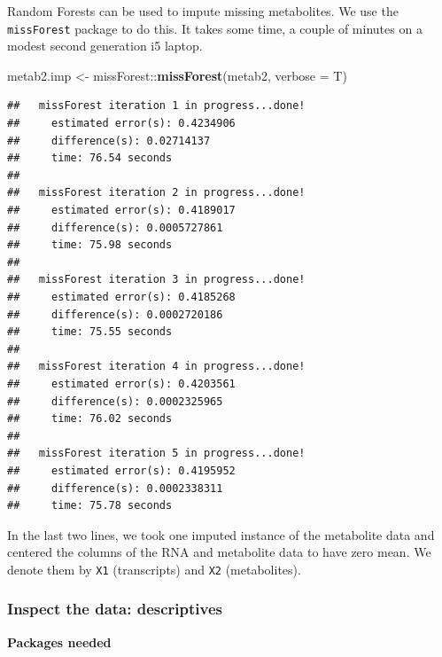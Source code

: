 \documentclass[]{article}
\newenvironment{Shaded}{\begin{snugshade}}{\end{snugshade}}
\newcommand{\KeywordTok}[1]{\textcolor[rgb]{0.13,0.29,0.53}{\textbf{{#1}}}}
\newcommand{\DataTypeTok}[1]{\textcolor[rgb]{0.13,0.29,0.53}{{#1}}}
\newcommand{\StringTok}[1]{\textcolor[rgb]{0.31,0.60,0.02}{{#1}}}
\newcommand{\NormalTok}[1]{{#1}}
\begin{document}
Random Forests can be used to impute missing metabolites. We use the
\texttt{missForest} package to do this. It takes some time, a couple of
minutes on a modest second generation i5 laptop.

\begin{Shaded}
\begin{Highlighting}[]
\NormalTok{metab2.imp <-}\StringTok{ }\NormalTok{missForest::}\KeywordTok{missForest}\NormalTok{(metab2, }\DataTypeTok{verbose =} \NormalTok{T)}
\end{Highlighting}
\end{Shaded}

\begin{verbatim}
##   missForest iteration 1 in progress...done!
##     estimated error(s): 0.4234906 
##     difference(s): 0.02714137 
##     time: 76.54 seconds
## 
##   missForest iteration 2 in progress...done!
##     estimated error(s): 0.4189017 
##     difference(s): 0.0005727861 
##     time: 75.98 seconds
## 
##   missForest iteration 3 in progress...done!
##     estimated error(s): 0.4185268 
##     difference(s): 0.0002720186 
##     time: 75.55 seconds
## 
##   missForest iteration 4 in progress...done!
##     estimated error(s): 0.4203561 
##     difference(s): 0.0002325965 
##     time: 76.02 seconds
## 
##   missForest iteration 5 in progress...done!
##     estimated error(s): 0.4195952 
##     difference(s): 0.0002338311 
##     time: 75.78 seconds
\end{verbatim}

\begin{Shaded}
\end{Shaded}

In the last two lines, we took one imputed instance of the metabolite
data and centered the columns of the RNA and metabolite data to have
zero mean. We denote them by \texttt{X1} (transcripts) and \texttt{X2}
(metabolites).

\subsubsection{Inspect the data:
descriptives}\label{inspect-the-data-descriptives}

\textbf{Packages needed}
\end{document}
